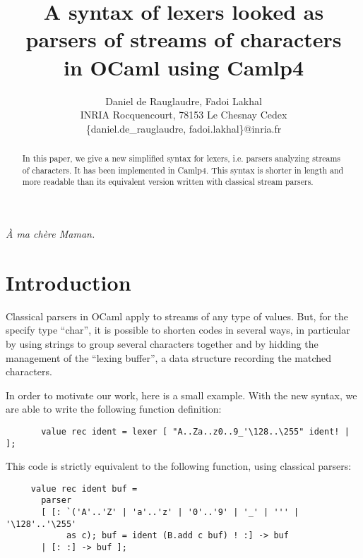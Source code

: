 \documentclass[11pt]{article}
\begin{document}
\title{A syntax of lexers looked as parsers of streams of characters\\
  in OCaml using Camlp4}

\date{}
\author{Daniel de Rauglaudre, Fadoi Lakhal\\
INRIA Rocquencourt,
78153 Le Chesnay Cedex \\
\{daniel.de\_rauglaudre, fadoi.lakhal\}@inria.fr}

\thispagestyle{empty}

\maketitle

\begin{flushright}
{\em \`{A} ma ch\`{e}re Maman.}
\end{flushright}

\begin{abstract}
In this paper, we give a new simplified syntax for lexers,
i.e. parsers analyzing streams of characters. It has been implemented
in Camlp4. This syntax is shorter in length and more readable than its
equivalent version written with classical stream parsers.
\end{abstract}

\section{Introduction}

Classical parsers in OCaml apply to streams of any type of
values. But, for the specify type ``char'', it is possible to shorten
codes in several ways, in particular by using strings to group several
characters together and by hidding the management of the ``lexing
buffer'', a data structure recording the matched characters.

In order to motivate our work, here is a small example. With the new
syntax, we are able to write the following function definition:

\begin{verbatim}
       value rec ident = lexer [ "A..Za..z0..9_'\128..\255" ident! | ];
\end{verbatim}

This code is strictly equivalent to the following function, using classical
parsers:

\begin{verbatim}
     value rec ident buf =
       parser
       [ [: `('A'..'Z' | 'a'..'z' | '0'..'9' | '_' | ''' | '\128'..'\255'
            as c); buf = ident (B.add c buf) ! :] -> buf
       | [: :] -> buf ];
\end{verbatim}
\end{document}
